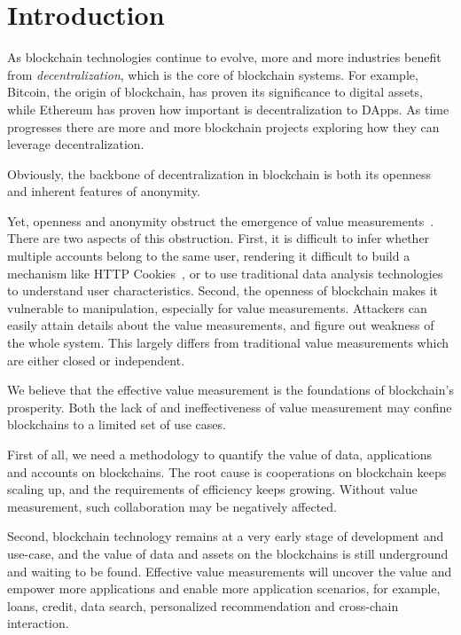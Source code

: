 
\section{Introduction}

As blockchain technologies continue to evolve, more and more industries benefit from \emph{decentralization}, which
is the core of blockchain systems. For example, Bitcoin, the origin of
blockchain, has proven its significance to digital assets, while Ethereum has
proven how important is decentralization to DApps. As time progresses there are more and more
blockchain projects exploring how they can leverage decentralization.

Obviously, the backbone of decentralization in blockchain is both its openness and inherent features of anonymity.


Yet, openness and anonymity obstruct the emergence of value
measurements~\cite{meiklejohn2013fistful}. There are two aspects of this obstruction. First, it is
difficult to infer whether multiple accounts belong to the same user, rendering it difficult to build a mechanism like HTTP Cookies~\cite{Cookie}, or to use
traditional data analysis technologies to understand user characteristics.
Second, the openness of blockchain makes it vulnerable to manipulation,
especially for value measurements. Attackers can easily attain details about the
value measurements, and figure out weakness of the whole system. This
largely differs from traditional value measurements which are either closed or
independent.

We believe that the effective value measurement is the foundations of
blockchain's prosperity. Both the lack of and ineffectiveness of value measurement may confine blockchains to a limited set of use cases.

First of all, we need a methodology to quantify the value of data,
applications and accounts on blockchains. The root cause is cooperations on
blockchain keeps scaling up, and the requirements of efficiency
keeps growing. Without value measurement, such collaboration may be negatively affected.

Second, blockchain technology remains at a very early stage of development and use-case, and the value of data
and assets on the blockchains is still underground and waiting to be found.
Effective value measurements will uncover the value and empower more applications and enable more application scenarios, for example, loans, credit, data search, personalized recommendation and cross-chain interaction.

